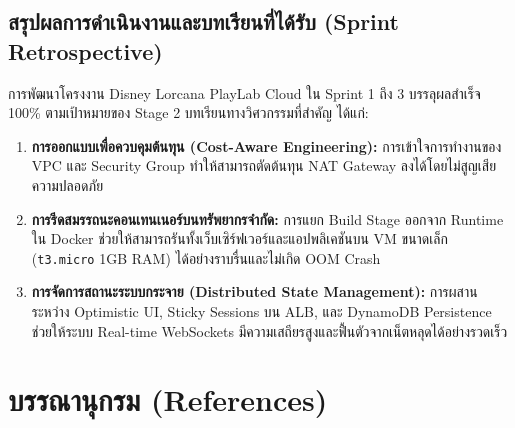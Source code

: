 \documentclass[12pt,a4paper]{report}
\begin{document}
\section{สรุปผลการดำเนินงานและบทเรียนที่ได้รับ (Sprint Retrospective)}
การพัฒนาโครงงาน Disney Lorcana PlayLab Cloud ใน Sprint 1 ถึง 3 บรรลุผลสำเร็จ 100\% ตามเป้าหมายของ Stage 2 บทเรียนทางวิศวกรรมที่สำคัญ ได้แก่:
\begin{enumerate}
    \item \textbf{การออกแบบเพื่อควบคุมต้นทุน (Cost-Aware Engineering):} การเข้าใจการทำงานของ VPC และ Security Group ทำให้สามารถตัดต้นทุน NAT Gateway ลงได้โดยไม่สูญเสียความปลอดภัย
    \item \textbf{การรีดสมรรถนะคอนเทนเนอร์บนทรัพยากรจำกัด:} การแยก Build Stage ออกจาก Runtime ใน Docker ช่วยให้สามารถรันทั้งเว็บเซิร์ฟเวอร์และแอปพลิเคชันบน VM ขนาดเล็ก (\texttt{t3.micro} 1GB RAM) ได้อย่างราบรื่นและไม่เกิด OOM Crash
    \item \textbf{การจัดการสถานะระบบกระจาย (Distributed State Management):} การผสานระหว่าง Optimistic UI, Sticky Sessions บน ALB, และ DynamoDB Persistence ช่วยให้ระบบ Real-time WebSockets มีความเสถียรสูงและฟื้นตัวจากเน็ตหลุดได้อย่างรวดเร็ว
\end{enumerate}

\chapter*{บรรณานุกรม (References)}
\end{document}
